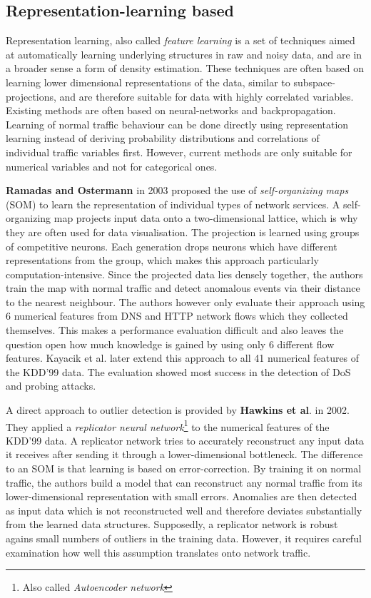 \documentclass[a4paper,12pt,twoside]{report}
\begin{document}
\subsection{Representation-learning based}

Representation learning, also called \textit{feature learning} is a set of techniques aimed at automatically learning underlying structures in raw and noisy data, and are in a broader sense a form of density estimation. These techniques are often based on learning lower dimensional representations of the data, similar to subspace-projections, and are therefore suitable for data with highly correlated variables. Existing methods are often based on neural-networks and backpropagation. Learning of normal traffic behaviour can be done directly using representation learning instead of deriving probability distributions and correlations of individual traffic variables first. However, current methods are only suitable for numerical variables and not for categorical ones.


\textbf{Ramadas and Ostermann} \cite{ramadas2003detecting} in 2003 proposed the use of \textit{self-organizing maps} (SOM) to learn the representation of individual types of network services. A self-organizing map projects input data onto a two-dimensional lattice, which is why they are often used for data visualisation. The projection is learned using groups of competitive neurons. Each generation drops neurons which have different representations from the group, which makes this approach particularly computation-intensive. Since the projected data lies densely together, the authors train the map with normal traffic and detect anomalous events via their distance to the nearest neighbour. The authors however only evaluate their approach using 6 numerical features from DNS and HTTP network flows which they collected themselves. This makes a performance evaluation difficult and also leaves the question open how much knowledge is gained by using only 6 different flow features. Kayacik et al. \cite{kayacik2007hierarchical} later extend this approach to all 41 numerical features of the KDD'99 data. The evaluation showed most success in the detection of DoS and probing attacks.


A direct approach to outlier detection is provided by \textbf{Hawkins et al}. \cite{hawkins_outlier_2002} in 2002. They applied a \textit{replicator neural network}\footnote{Also called \textit{Autoencoder network}} to the numerical features of the KDD'99 data. A replicator network tries to accurately reconstruct any input data it receives after sending it through a lower-dimensional bottleneck. The difference to an SOM is that learning is based on error-correction. By training it on normal traffic, the authors build a model that can reconstruct any normal traffic from its lower-dimensional representation with small errors. Anomalies are then detected as input data which is not reconstructed well and therefore deviates substantially from the learned data structures. Supposedly, a replicator network is robust agains small numbers of outliers in the training data. However, it requires careful examination how well this assumption translates onto network traffic. 
\end{document}
